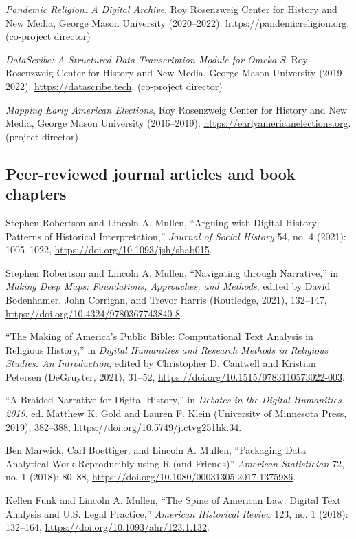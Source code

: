 \documentclass[11pt]{article}
\begin{document}
\emph{Pandemic Religion: A Digital Archive}, Roy Rosenzweig Center for History and New Media, George Mason University (2020--2022): \url{https://pandemicreligion.org}. (co-project director)

\emph{DataScribe: A Structured Data Transcription Module for Omeka S}, Roy Rosenzweig Center for History and New Media, George Mason University (2019--2022): \url{https://datascribe.tech}. (co-project director)

\emph{Mapping Early American Elections}, Roy Rosenzweig Center for History and New Media, George Mason University (2016--2019): \url{https://earlyamericanelections.org}. (project director)

\subsection{Peer-reviewed journal articles and book chapters}\label{Peer-reviewed articles and chapters}

Stephen Robertson and Lincoln A. Mullen, ``Arguing with Digital History: Patterns of Historical Interpretation,'' \emph{Journal of Social History} 54, no. 4 (2021): 1005--1022, \url{https://doi.org/10.1093/jsh/shab015}.

Stephen Robertson and Lincoln A. Mullen, ``Navigating through Narrative,'' in \emph{Making Deep Maps: Foundations, Approaches, and Methods}, edited by David Bodenhamer, John Corrigan, and Trevor Harris (Routledge, 2021), 132--147, \url{https://doi.org/10.4324/9780367743840-8}.

``The Making of America's Public Bible: Computational Text Analysis in Religious History,'' in \emph{Digital Humanities and Research Methods in Religious Studies: An Introduction}, edited by Christopher D. Cantwell and 
Kristian Petersen (DeGruyter, 2021), 31--52, \url{https://doi.org/10.1515/9783110573022-003}.

``A Braided Narrative for Digital History,'' in \emph{Debates in the Digital Humanities 2019}, ed. Matthew K. Gold and Lauren F. Klein (University of Minnesota Press, 2019), 382--388, \url{ https://doi.org/10.5749/j.ctvg251hk.34}.

Ben Marwick, Carl Boettiger, and Lincoln A. Mullen, ``Packaging Data Analytical Work Reproducibly using R (and Friends)'' \emph{American Statistician} 72, no. 1 (2018): 80--88, \url{https://doi.org/10.1080/00031305.2017.1375986}.

Kellen Funk and Lincoln A. Mullen, ``The Spine of American Law: Digital Text Analysis and U.S. Legal Practice,'' \emph{American Historical Review} 123, no.  1 (2018): 132--164, \url{https://doi.org/10.1093/ahr/123.1.132}.
\end{document}
